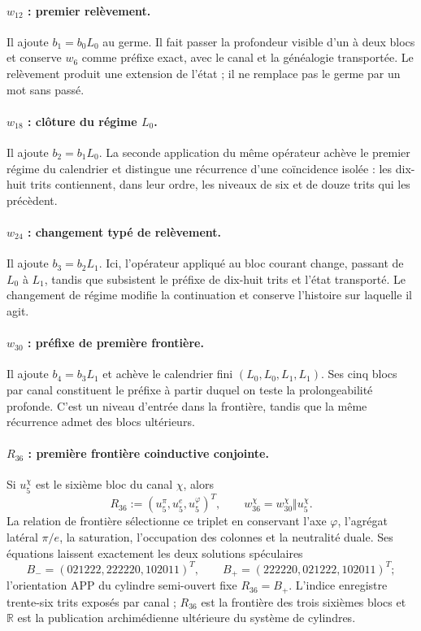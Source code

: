 \paragraph{\(w_{12}\) : premier relèvement.}
Il ajoute \(b_1=b_0L_0\) au germe. Il fait passer la profondeur visible d'un à deux
blocs et conserve \(w_6\) comme préfixe exact, avec le canal et la
généalogie transportée. Le relèvement produit une extension de l'état ; il ne
remplace pas le germe par un mot sans passé.

\paragraph{\(w_{18}\) : clôture du régime \(L_0\).}
Il ajoute \(b_2=b_1L_0\). La seconde application du même opérateur achève le
premier régime du calendrier et distingue une récurrence d'une coïncidence
isolée : les dix-huit trits contiennent, dans leur ordre, les niveaux de six et de
douze trits qui les précèdent.

\paragraph{\(w_{24}\) : changement typé de relèvement.}
Il ajoute \(b_3=b_2L_1\). Ici, l'opérateur appliqué au bloc courant change,
passant de \(L_0\) à \(L_1\), tandis que subsistent le préfixe de dix-huit trits et
l'état transporté. Le changement de régime modifie la continuation et conserve
l'histoire sur laquelle il agit.

\paragraph{\(w_{30}\) : préfixe de première frontière.}
Il ajoute \(b_4=b_3L_1\) et achève le calendrier fini
\((L_0,L_0,L_1,L_1)\). Ses cinq blocs par canal constituent le préfixe
à partir duquel on teste la prolongeabilité profonde. C'est un niveau d'entrée dans
la frontière, tandis que la même récurrence admet des blocs ultérieurs.

\paragraph{\(R_{36}\) : première frontière coinductive conjointe.}
Si \(u_5^\chi\) est le sixième bloc du canal \(\chi\), alors
\[
 R_{36}:=(u_5^\pi,u_5^e,u_5^\varphi)^T,
 \qquad
 w_{36}^\chi=w_{30}^\chi\Vert u_5^\chi.
\]
La relation de frontière sélectionne ce triplet en conservant l'axe
\(\varphi\), l'agrégat latéral \(\pi/e\), la saturation, l'occupation des
colonnes et la neutralité duale. Ses équations laissent exactement les deux
solutions spéculaires
\[
 B_-=(021222,222220,102011)^T,
 \qquad
 B_+=(222220,021222,102011)^T;
\]
l'orientation APP du cylindre semi-ouvert fixe
\(R_{36}=B_+\). L'indice enregistre trente-six trits
exposés par canal ; \(R_{36}\) est la frontière des trois sixièmes blocs et
\(\mathbb R\) est la publication archimédienne ultérieure du système de
cylindres.

